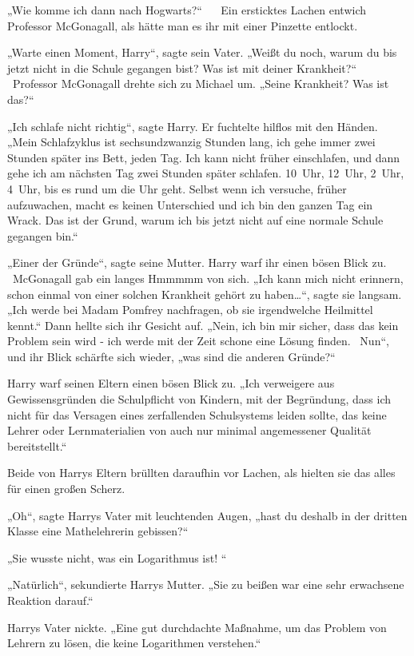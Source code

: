 {„Wie komme ich dann nach Hogwarts?“ ~ ~Ein ersticktes Lachen entwich Professor McGonagall, als hätte man es ihr mit einer Pinzette entlockt. ~ ~

„Warte einen Moment, Harry“, sagte sein Vater. „Weißt du noch, warum du bis jetzt nicht in die Schule gegangen bist? Was ist mit deiner Krankheit?“ ~ ~Professor McGonagall drehte sich zu Michael um. „Seine Krankheit? Was ist das?“ ~ ~

„Ich schlafe nicht richtig“, sagte Harry. Er fuchtelte hilflos mit den Händen. „Mein Schlafzyklus ist sechsundzwanzig Stunden lang, ich gehe immer zwei Stunden später ins Bett, jeden Tag. Ich kann nicht früher einschlafen, und dann gehe ich am nächsten Tag zwei Stunden später schlafen. 10~Uhr, 12~Uhr, 2~Uhr, 4~Uhr, bis es rund um die Uhr geht. Selbst wenn ich versuche, früher aufzuwachen, macht es keinen Unterschied und ich bin den ganzen Tag ein Wrack. Das ist der Grund, warum ich bis jetzt nicht auf eine normale Schule gegangen bin.“ ~ ~

„Einer der Gründe“, sagte seine Mutter. Harry warf ihr einen bösen Blick zu. ~ ~McGonagall gab ein langes Hmmmmm von sich. „Ich kann mich nicht erinnern, schon einmal von einer solchen Krankheit gehört zu haben…“, sagte sie langsam. „Ich werde bei Madam Pomfrey nachfragen, ob sie irgendwelche Heilmittel kennt.“ Dann hellte sich ihr Gesicht auf. „Nein, ich bin mir sicher, dass das kein Problem sein wird - ich werde mit der Zeit schone eine Lösung finden. ~Nun“, und ihr Blick schärfte sich wieder, „was sind die anderen Gründe?“ ~ ~

Harry warf seinen Eltern einen bösen Blick zu. „Ich verweigere aus Gewissensgründen die Schulpflicht von Kindern, mit der Begründung, dass ich nicht für das Versagen eines zerfallenden Schulsystems leiden sollte, das keine Lehrer oder Lernmaterialien von auch nur minimal angemessener Qualität bereitstellt.“ ~ ~

Beide von Harrys Eltern brüllten daraufhin vor Lachen, als hielten sie das alles für einen großen Scherz.

„Oh“, sagte Harrys Vater mit leuchtenden Augen, „hast du deshalb in der dritten Klasse eine Mathelehrerin gebissen?“ ~ ~

„Sie wusste nicht, was ein Logarithmus ist! “

„Natürlich“, sekundierte Harrys Mutter. „Sie zu beißen war eine sehr erwachsene Reaktion darauf.“ ~ ~

Harrys Vater nickte. „Eine gut durchdachte Maßnahme, um das Problem von Lehrern zu lösen, die keine Logarithmen verstehen.“ ~ ~

}
